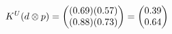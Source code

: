 \documentclass[preview]{standalone}
\begin{document}
\begin{align*}
\special{dvisvgm:raw <g id='unique000'>}K^U(d \otimes p) = \begin{pmatrix} (0.69)(0.57) \\ (0.88)(0.73) \end{pmatrix} = \begin{pmatrix} 0.39 \\ 0.64 \end{pmatrix}\special{dvisvgm:raw </g>}
\end{align*}
\end{document}
